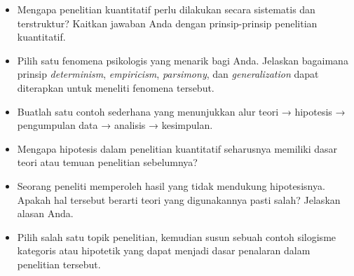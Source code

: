\documentclass[
  indonesian,
  letterpaper,
  DIV=11,
  numbers=noendperiod]{scrreprt}
\providecommand{\tightlist}{%
  \setlength{\itemsep}{0pt}\setlength{\parskip}{0pt}}
\begin{document}
\begin{tcolorbox}[enhanced jigsaw, colframe=quarto-callout-important-color-frame, toptitle=1mm, breakable, leftrule=.75mm, arc=.35mm, toprule=.15mm, colback=white, colbacktitle=quarto-callout-important-color!10!white, bottomtitle=1mm, bottomrule=.15mm, titlerule=0mm, title=\textcolor{quarto-callout-important-color}{\faExclamation}\hspace{0.5em}{Refleksi \& Diskusi}, coltitle=black, left=2mm, opacitybacktitle=0.6, opacityback=0, rightrule=.15mm]

\begin{itemize}
\tightlist
\item
  Mengapa penelitian kuantitatif perlu dilakukan secara sistematis dan
  terstruktur? Kaitkan jawaban Anda dengan prinsip-prinsip penelitian
  kuantitatif.
\item
  Pilih satu fenomena psikologis yang menarik bagi Anda. Jelaskan
  bagaimana prinsip \emph{determinism}, \emph{empiricism},
  \emph{parsimony}, dan \emph{generalization} dapat diterapkan untuk
  meneliti fenomena tersebut.
\item
  Buatlah satu contoh sederhana yang menunjukkan alur teori → hipotesis
  → pengumpulan data → analisis → kesimpulan.
\item
  Mengapa hipotesis dalam penelitian kuantitatif seharusnya memiliki
  dasar teori atau temuan penelitian sebelumnya?
\item
  Seorang peneliti memperoleh hasil yang tidak mendukung hipotesisnya.
  Apakah hal tersebut berarti teori yang digunakannya pasti salah?
  Jelaskan alasan Anda.
\item
  Pilih salah satu topik penelitian, kemudian susun sebuah contoh
  silogisme kategoris atau hipotetik yang dapat menjadi dasar penalaran
  dalam penelitian tersebut.
\end{itemize}

\end{tcolorbox}
\end{document}
